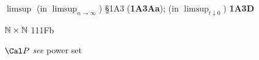 $\limsup$ (in $\limsup_{n\to\infty}$) \S1A3 ({\bf 1A3Aa});
  (in $\limsup_{t\downarrow 0}$) {\bf 1A3D}
















































































\indexmedskip
{}



$\Bbb N\times\Bbb N$ 111Fb























\indexmedskip
{}



$\Cal P$ {\it see} power set

























